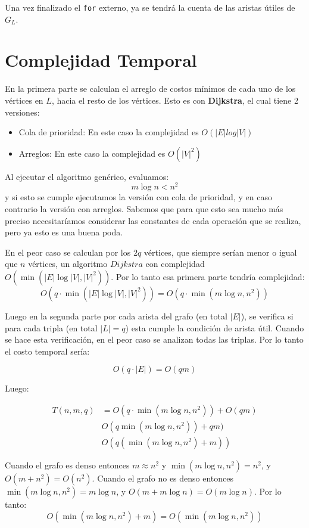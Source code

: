 \documentclass[a4paper]{article}
\begin{document}
	Una vez finalizado el \texttt{for} externo, ya se tendrá la cuenta de las aristas útiles de $G_L$.
	

	\section*{Complejidad Temporal}
	
	En la primera parte se calculan el arreglo de costos mínimos de cada uno de los vértices en $L$, hacia el resto de los vértices. Esto es con \textbf{Dijkstra}, el cual tiene 2 versiones:
	\begin{itemize}
		\item Cola de prioridad: En este caso la complejidad es $O(|E|log|V|)$
		\item Arreglos: En este caso la complejidad es $O(|V|^2)$
	\end{itemize}
	Al ejecutar el algoritmo genérico, evaluamos:
	$$ m\log n < n^2$$
	y si esto se cumple ejecutamos la versión con cola de prioridad, y en caso contrario la versión con arreglos. Sabemos que para que esto sea mucho más preciso necesitaríamos considerar las constantes de cada operación que se realiza, pero ya esto es una buena poda.
	
	En el peor caso se calculan por los $2q$ vértices, que siempre serían menor o igual que $n$ vértices, un algoritmo $Dijkstra$ con complejidad $O(\min(|E|\log|V|, |V|^2))$. Por lo tanto esa primera parte tendría complejidad:
	$$ O(q \cdot \min(|E|\log|V|, |V|^2)) = O(q\cdot \min(m\log n, n^2)) $$
	
	Luego en la segunda parte por cada arista del grafo (en total $|E|$), se verifica si para cada tripla (en total $|L| = q$) esta cumple la condición de arista útil. Cuando se hace esta verificación, en el peor caso se analizan todas las triplas. Por lo tanto el costo temporal sería:
	
	$$ O(q \cdot |E|) = O(qm) $$
	
	Luego:
	
	\begin{align*}
		T(n,m,q) & = O(q\cdot \min(m\log n, n^2)) + O(qm)\\
		& O(q \min(m\log n, n^2)) + qm) \\
		& O(q (\min(m\log n, n^2) + m))
	\end{align*}

	Cuando el grafo es denso entonces $m \approx n^2$ y $\min(m\log n, n^2) = n^2$, y $O(m + n^2) = O(n^2)$. Cuando el grafo no es denso entonces $\min(m\log n, n^2) = m\log n$, y $O(m + m\log n) = O(m\log n)$. Por lo tanto:
	$$ O(\min(m\log n, n^2) + m) = O(\min(m\log n, n^2)) $$
	
\end{document}
